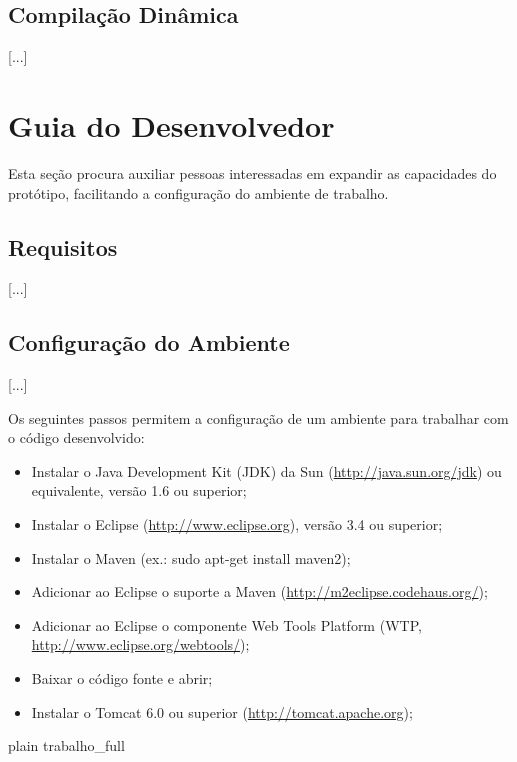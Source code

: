 \documentclass{abnt}
\begin{document}
\subsection{Compilação Dinâmica}
[...]

\section {Guia do Desenvolvedor}

Esta seção procura auxiliar pessoas interessadas em expandir as capacidades do protótipo, facilitando a configuração do ambiente de trabalho.

\subsection {Requisitos}
[...]
\subsection {Configuração do Ambiente}
[...]

Os seguintes passos permitem a configuração de um ambiente para trabalhar com o código desenvolvido:

\begin{itemize}
\item Instalar o Java Development Kit (JDK) da Sun (\url{http://java.sun.org/jdk}) ou equivalente, versão 1.6 ou superior;
\item Instalar o Eclipse (\url{http://www.eclipse.org}), versão 3.4 ou superior;
\item Instalar o Maven (ex.: sudo apt-get install maven2);
\item Adicionar ao Eclipse o suporte a Maven (\url{http://m2eclipse.codehaus.org/});
\item Adicionar ao Eclipse o componente Web Tools Platform (WTP, \url{http://www.eclipse.org/webtools/});
\item Baixar o código fonte e abrir;
\item Instalar o Tomcat 6.0 ou superior (\url{http://tomcat.apache.org});
\end{itemize}

\nocite{*}
 {plain}
 {trabalho_full}
\end{document}
